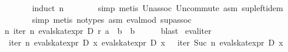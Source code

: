 \begin{isabellebody}
\ \ \ \ \ \ \isamarkupfalse%
\ {}induct\ n{}\isanewline
\ \ \ \ \ \ \isamarkupfalse%
\ {}simp{}\ metis\ Un{}assoc\ Un{}commute\ asm\ sup{}left{}idem{}\isanewline
\ \ \ \ \ \ \isamarkupfalse%
\ {}simp{}\ metis\ {}no{}types{}\ asm\ eval{}mod{}\ sup{}assoc{}\isanewline
\ \ \isamarkupfalse%
\isanewline
\ \ \isamarkupfalse%
\ {}{}{}n{}\ iter\ n\ {}eval{}skat{}expr\ D\ r{}\ a{}\ {}\ b\ {}\ b{}\isanewline
\ \ \ \ \isamarkupfalse%
\ blast\isanewline
{}\isamarkupfalse%
%
\endisatagproof
{\isafoldproof}%
%
\isadelimproof
\isanewline
%
\endisadelimproof
\isanewline
{}\isamarkupfalse%
\ eval{}iter{}\isanewline
\ \ {}iter\ n\ {}eval{}skat{}expr\ D\ x{}\ {}eval{}skat{}expr\ D\ x\ {}{}\ {}\ iter\ {}Suc\ n{}\ {}eval{}skat{}expr\ D\ x{}\ {}{}\isanewline

\end{isabellebody}
